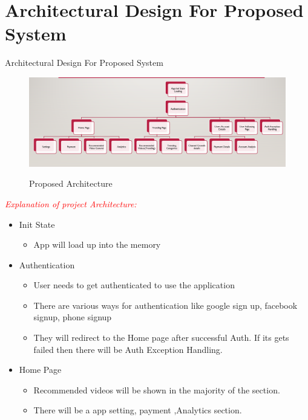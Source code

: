 \documentclass{beamer}
\begin{document}
\section{Architectural Design For Proposed System}
\begin{frame}[allowframebreaks]{Architectural Design For Proposed System}
    \begin{figure}
		{\includegraphics[scale=.4]{arch.PNG}}
			\caption{Proposed Architecture}
			\label{arch1}
	\end{figure}
	\begin{center}
	\textcolor{red}{\textit{Explanation of project Architecture: }}\\
	\begin{itemize}
		\item Init State
		 \begin{itemize}
    \item App will load up into the memory
    
  \end{itemize}
		
		\item  Authentication
 \begin{itemize}
    \item User needs to get authenticated to use the application

     \item There are various ways for authentication like google sign up, facebook signup, phone signup

      \item They will redirect to the Home page after successful Auth. If its gets failed then there will be Auth Exception Handling.

    
  \end{itemize}
		\item  Home Page
 \begin{itemize}
    \item Recommended videos will be shown in the majority of the section.


     \item There will be a app setting, payment ,Analytics section.



\end{itemize}
\end{itemize}
\end{center}
\end{frame}
\end{document}
